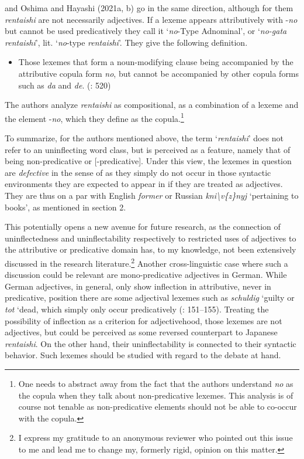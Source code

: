 \documentclass[output=paper]{langscibook}
\begin{document}
\citet{OshimaEtAl2019} and Oshima and Hayashi (2021a, b) go in the same direction, although for them \textit{rentaishi} are not necessarily adjectives. If a lexeme appears attributively with -\textit{no} but cannot be used predicatively they call it ‘\textit{no}{}-Type Adnominal’, or ‘\textit{no-gata rentaishi}’, lit. ‘\textit{no}{}-type \textit{rentaishi}’. They give the following definition.

\begin{itemize}
\item \begin{styleBeispielCinqueKapitel}
Those lexemes that form a noun-modifying clause being accompanied by the attributive copula form \textit{no}, but cannot be accompanied by other copula forms such as \textit{da} and \textit{de}. (\citealt{OshimaHayashi2021b}: 520) 
\end{styleBeispielCinqueKapitel}
\end{itemize}

The authors analyze \textit{rentaishi} as compositional, as a combination of a lexeme and the element -\textit{no}, which they define as the copula.\footnote{One needs to abstract away from the fact that the authors understand \textit{no} as the copula when they talk about non-predicative lexemes. This analysis is of course not tenable as non-predicative elements should not be able to co-occur with the copula.} 

To summarize, for the authors mentioned above, the term ‘\textit{rentaishi}’ does not refer to an uninflecting word class, but is perceived as a feature, namely that of being non-predicative or [-predicative]. Under this view, the lexemes in question are \textit{defective} in the sense of \citet{Spencer2020} as they simply do not occur in those syntactic environments they are expected to appear in if they are treated as adjectives. They are thus on a par with English \textit{former} or Russian \textit{kni{\textbackslash}v\{z\}nyj} ‘pertaining to books’, as mentioned in section 2.

This potentially opens a new avenue for future research, as the connection of uninflectedness and uninflectability respectively to restricted uses of adjectives to the attributive or predicative domain has, to my knowledge, not been extensively discussed in the research literature.\footnote{I express my gratitude to an anonymous reviewer who pointed out this issue to me and lead me to change my, formerly rigid, opinion on this matter.} Another cross-linguistic case where such a discussion could be relevant are mono-predicative adjectives in German. While German adjectives, in general, only show inflection in attributive, never in predicative, position there are some adjectival lexemes such as \textit{schuldig} ‘guilty or \textit{tot} ‘dead, which simply only occur predicatively (\citealt{Trost2006}: 151–155). Treating the possibility of inflection as a criterion for adjectivehood, those lexemes are not adjectives, but could be perceived as some reversed counterpart to Japanese \textit{rentaishi}. On the other hand, their uninflectability is connected to their syntactic behavior. Such lexemes should be studied with regard to the debate at hand. 
\end{document}
